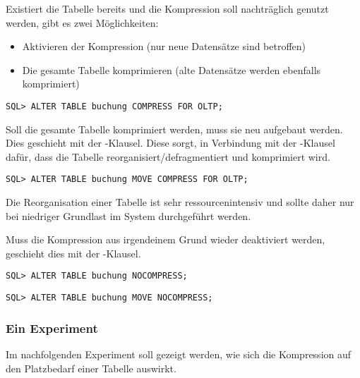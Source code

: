          Existiert die Tabelle bereits und die Kompression soll nachtr\"aglich genutzt werden, gibt es zwei M\"oglichkeiten:
          \begin{itemize}
            \item Aktivieren der Kompression (nur neue Datens\"atze sind betroffen)
            \item Die gesamte Tabelle komprimieren (alte Datens\"atze werden ebenfalls komprimiert)
          \end{itemize}
          \begin{lstlisting}[caption={Nachtr\"agliches aktivieren der OLTP Kompression},label=admin303,language=oracle_sql]
SQL> ALTER TABLE buchung COMPRESS FOR OLTP;
          \end{lstlisting}
          Soll die gesamte Tabelle komprimiert werden, muss sie neu aufgebaut werden. Dies geschieht mit der -Klausel. Diese sorgt, in Verbindung mit der -Klausel daf\"ur, dass die Tabelle reorganisiert/defragmentiert und komprimiert wird.
          \begin{lstlisting}[caption={Komprimieren einer Tabelle},label=admin304,language=oracle_sql]
SQL> ALTER TABLE buchung MOVE COMPRESS FOR OLTP;
          \end{lstlisting}
          \begin{merke}
            Die Reorganisation einer Tabelle ist sehr ressourcenintensiv und sollte daher nur bei niedriger Grundlast im System durchgef\"uhrt werden.
          \end{merke}
          Muss die Kompression aus irgendeinem Grund wieder deaktiviert werden, geschieht dies mit der -Klausel.
          \begin{lstlisting}[caption={Deaktivieren der Kompression},label=admin305,language=oracle_sql]
SQL> ALTER TABLE buchung NOCOMPRESS;
          \end{lstlisting}
          \begin{lstlisting}[caption={Dekomprimieren einer Tabelle},label=admin306,language=oracle_sql]
SQL> ALTER TABLE buchung MOVE NOCOMPRESS;
          \end{lstlisting}
        \subsubsection{Ein Experiment}
          Im nachfolgenden Experiment soll gezeigt werden, wie sich die Kompression auf den Platzbedarf einer Tabelle auswirkt.


